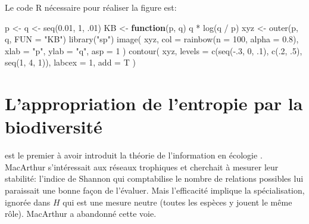 \documentclass[
  11pt,
  american,
  a4paper,
  extrafontsizes,onecolumn,openright
  ]{memoir}
\newenvironment{Shaded}{\begin{snugshade}}{\end{snugshade}}
\newcommand{\AttributeTok}[1]{\textcolor[rgb]{0.77,0.63,0.00}{#1}}
\newcommand{\ControlFlowTok}[1]{\textcolor[rgb]{0.13,0.29,0.53}{\textbf{#1}}}
\newcommand{\DecValTok}[1]{\textcolor[rgb]{0.00,0.00,0.81}{#1}}
\newcommand{\FloatTok}[1]{\textcolor[rgb]{0.00,0.00,0.81}{#1}}
\newcommand{\FunctionTok}[1]{\textcolor[rgb]{0.00,0.00,0.00}{#1}}
\newcommand{\NormalTok}[1]{#1}
\newcommand{\OtherTok}[1]{\textcolor[rgb]{0.56,0.35,0.01}{#1}}
\newcommand{\SpecialCharTok}[1]{\textcolor[rgb]{0.00,0.00,0.00}{#1}}
\newcommand{\StringTok}[1]{\textcolor[rgb]{0.31,0.60,0.02}{#1}}
\begin{document}
Le code R nécessaire pour réaliser la figure est:

\scriptsize

\begin{Shaded}
\begin{Highlighting}[]
\NormalTok{p }\OtherTok{\textless{}{-}}\NormalTok{ q }\OtherTok{\textless{}{-}} \FunctionTok{seq}\NormalTok{(}\FloatTok{0.01}\NormalTok{, }\DecValTok{1}\NormalTok{, .}\DecValTok{01}\NormalTok{)}
\NormalTok{KB }\OtherTok{\textless{}{-}} \ControlFlowTok{function}\NormalTok{(p, q) q }\SpecialCharTok{*} \FunctionTok{log}\NormalTok{(q }\SpecialCharTok{/}\NormalTok{ p)}
\NormalTok{xyz }\OtherTok{\textless{}{-}} \FunctionTok{outer}\NormalTok{(p, q, }\AttributeTok{FUN =} \StringTok{"KB"}\NormalTok{)}
\FunctionTok{library}\NormalTok{(}\StringTok{"sp"}\NormalTok{)}
\FunctionTok{image}\NormalTok{(}
\NormalTok{  xyz, }
  \AttributeTok{col =} \FunctionTok{rainbow}\NormalTok{(}\AttributeTok{n =} \DecValTok{100}\NormalTok{, }\AttributeTok{alpha =} \FloatTok{0.8}\NormalTok{), }
  \AttributeTok{xlab =} \StringTok{"p"}\NormalTok{, }
  \AttributeTok{ylab =} \StringTok{"q"}\NormalTok{, }
  \AttributeTok{asp =} \DecValTok{1}
\NormalTok{)}
\FunctionTok{contour}\NormalTok{(}
\NormalTok{  xyz, }
  \AttributeTok{levels =} \FunctionTok{c}\NormalTok{(}\FunctionTok{seq}\NormalTok{(}\SpecialCharTok{{-}}\NormalTok{.}\DecValTok{3}\NormalTok{, }\DecValTok{0}\NormalTok{, .}\DecValTok{1}\NormalTok{), }\FunctionTok{c}\NormalTok{(.}\DecValTok{2}\NormalTok{, .}\DecValTok{5}\NormalTok{), }\FunctionTok{seq}\NormalTok{(}\DecValTok{1}\NormalTok{, }\DecValTok{4}\NormalTok{, }\DecValTok{1}\NormalTok{)), }
  \AttributeTok{labcex =} \DecValTok{1}\NormalTok{, }
  \AttributeTok{add =}\NormalTok{ T}
\NormalTok{)}
\end{Highlighting}
\end{Shaded}

\normalsize

\hypertarget{lappropriation-de-lentropie-par-la-biodiversituxe9}{%
\section{L'appropriation de l'entropie par la biodiversité}\label{lappropriation-de-lentropie-par-la-biodiversituxe9}}

\textcite{MacArthur1955} est le premier à avoir introduit la théorie de l'information en écologie \autocite{Ulanowicz2001}.
MacArthur s'intéressait aux réseaux trophiques et cherchait à mesurer leur stabilité: l'indice de Shannon qui comptabilise le nombre de relations possibles lui paraissait une bonne façon de l'évaluer.
Mais l'efficacité implique la spécialisation, ignorée dans \(H\) qui est une mesure neutre (toutes les espèces y jouent le même rôle).
MacArthur a abandonné cette voie.
\end{document}
